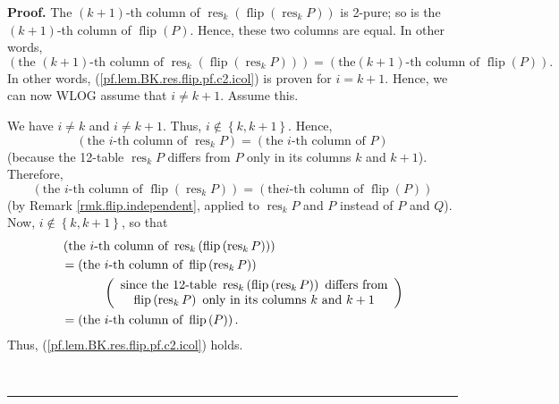 \documentclass[numbers=enddot,12pt,final,onecolumn,notitlepage]{scrartcl}%
\theoremstyle{definition}
\newenvironment{proof}[1][Proof]{\noindent\textbf{#1.} }{\ \rule{0.5em}{0.5em}}
\newenvironment{verlong}{}{}
\begin{document}
\begin{verlong}
\begin{proof}
The $\left(  k+1\right)  $-th column of $\operatorname*{res}\nolimits_{k}%
\left(  \operatorname*{flip}\left(  \operatorname*{res}\nolimits_{k}P\right)
\right)  $ is 2-pure; so is the $\left(  k+1\right)  $-th column of
$\operatorname*{flip}\left(  P\right)  $. Hence, these two columns are equal.
In other words,%
\[
\left(  \text{the }\left(  k+1\right)  \text{-th column of }%
\operatorname*{res}\nolimits_{k}\left(  \operatorname*{flip}\left(
\operatorname*{res}\nolimits_{k}P\right)  \right)  \right)  =\left(  \text{the
}\left(  k+1\right)  \text{-th column of }\operatorname*{flip}\left(
P\right)  \right)  .
\]
In other words, (\ref{pf.lem.BK.res.flip.pf.c2.icol}) is proven for $i=k+1$.
Hence, we can now WLOG assume that $i\neq k+1$. Assume this.

We have $i\neq k$ and $i\neq k+1$. Thus, $i\notin\left\{  k,k+1\right\}  $.
Hence,%
\[
\left(  \text{the }i\text{-th column of }\operatorname*{res}\nolimits_{k}%
P\right)  =\left(  \text{the }i\text{-th column of }P\right)
\]
(because the 12-table $\operatorname*{res}\nolimits_{k}P$ differs from $P$
only in its columns $k$ and $k+1$). Therefore,%
\[
\left(  \text{the }i\text{-th column of }\operatorname*{flip}\left(
\operatorname*{res}\nolimits_{k}P\right)  \right)  =\left(  \text{the
}i\text{-th column of }\operatorname*{flip}\left(  P\right)  \right)
\]
(by Remark \ref{rmk.flip.independent}, applied to $\operatorname*{res}%
\nolimits_{k}P$ and $P$ instead of $P$ and $Q$). Now, $i\notin\left\{
k,k+1\right\}  $, so that%
\begin{align*}
&  \left(  \text{the }i\text{-th column of }\operatorname*{res}\nolimits_{k}%
\left(  \operatorname*{flip}\left(  \operatorname*{res}\nolimits_{k}P\right)
\right)  \right) \\
&  =\left(  \text{the }i\text{-th column of }\operatorname*{flip}\left(
\operatorname*{res}\nolimits_{k}P\right)  \right) \\
&  \ \ \ \ \ \ \ \ \ \ \left(
\begin{array}
[c]{c}%
\text{since the 12-table }\operatorname*{res}\nolimits_{k}\left(
\operatorname*{flip}\left(  \operatorname*{res}\nolimits_{k}P\right)  \right)
\text{ differs from}\\
\operatorname*{flip}\left(  \operatorname*{res}\nolimits_{k}P\right)  \text{
only in its columns }k\text{ and }k+1
\end{array}
\right) \\
&  =\left(  \text{the }i\text{-th column of }\operatorname*{flip}\left(
P\right)  \right)  .
\end{align*}
Thus, (\ref{pf.lem.BK.res.flip.pf.c2.icol}) holds.


\end{proof}
\end{verlong}
\end{document}

